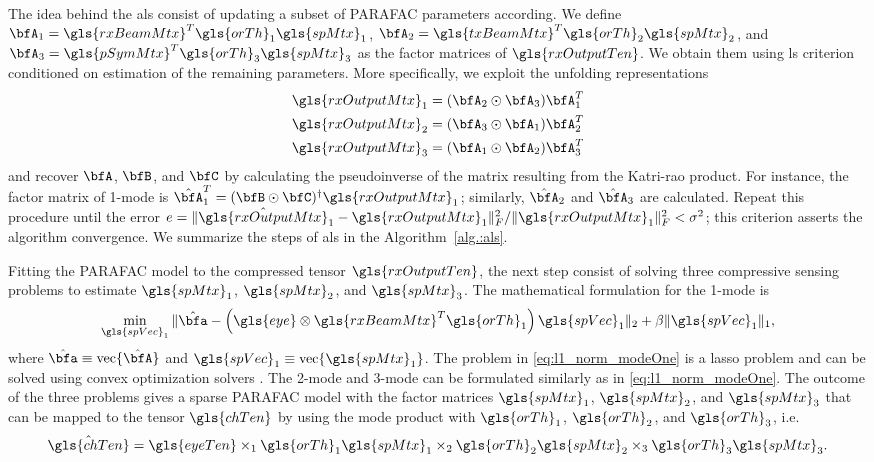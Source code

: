 \documentclass[conference]{IEEEtran}
\begin{document}
The idea behind the \gls{als} consist of updating a subset of \gls{PARAFAC} parameters
according. We define $\bfA _1 =
\gls{rxBeamMtx}^T\gls{orTh}_1\gls{spMtx}_1$, $\bfA_2 =
\gls{txBeamMtx}^T\gls{orTh}_2\gls{spMtx}_2$, and $\bfA_3 =
\gls{pSymMtx}^T\gls{orTh}_3\gls{spMtx}_3$   as the factor matrices of
$\gls{rxOutputTen}$. We obtain them using \gls{ls} criterion conditioned on estimation of the remaining
parameters. More specifically, we exploit the unfolding representations
\begin{align}
 \gls{rxOutputMtx}_1 = (\bfA_2 \odot \bfA_3)\bfA_1^T \\
 \gls{rxOutputMtx}_2 = (\bfA_3 \odot \bfA_1)\bfA_2^T \\
 \gls{rxOutputMtx}_3 = (\bfA_1 \odot \bfA_2)\bfA_3^T
\end{align}
and recover $\bfA$, $\bfB$, and $\bfC$ by calculating the pseudoinverse of the
matrix resulting from the Katri-rao product. For instance, the factor matrix of
1-mode is $\hat{\bfA}_1^T = (\bfB \odot \bfC)^{\dagger}\gls{rxOutputMtx}_1 $;
similarly, $\hat{\bfA}_2$ and $\hat{\bfA}_3$ are calculated. Repeat this procedure
until the error $e = \|\hat{\gls{rxOutputMtx}}_1 - \gls{rxOutputMtx}_1 \|^2_F/
\|\gls{rxOutputMtx}_1\|_F^2 < \sigma ^2$; this criterion asserts the algorithm convergence. We summarize the steps of \gls{als} in the Algorithm~\ref{alg.:als}. 

Fitting the \gls{PARAFAC} model to the compressed tensor $\gls{rxOutputTen}$,
the next step consist of solving three compressive sensing problems to estimate
$\gls{spMtx}_1$, $\gls{spMtx}_2$, and $\gls{spMtx}_3$. The mathematical
formulation for the 1-mode is
\begin{equation}
  \label{eq:l1_norm_modeOne}
  \min_{\gls{spVec}_1} \|\hat{\bfa} - \left( \gls{eye} \otimes \gls{rxBeamMtx}^T\gls{orTh}_1\right) \gls{spVec}_1\|_2 + \beta \|\gls{spVec}_1\|_1, 
\end{equation}
where $\hat{\bfa} \equiv \textrm{vec}\{\hat{\bfA}\}$ and  $\gls{spVec}_1 \equiv
\textrm{vec}\{\gls{spMtx}_1\}$. The problem in \eqref{eq:l1_norm_modeOne} is a
\gls{lasso} problem and can be solved using convex optimization solvers
\cite{Boyd:2004}. The 2-mode and 3-mode can be formulated similarly as in
\eqref{eq:l1_norm_modeOne}. The outcome of the three problems gives a sparse \gls{PARAFAC} model with
the factor matrices $\gls{spMtx}_1$, $\gls{spMtx}_2$, and $\gls{spMtx}_3$ that
can be mapped to the tensor $\gls{chTen}$ by using the mode product with
$\gls{orTh}_1$,  $\gls{orTh}_2$, and $\gls{orTh}_3$, i.e.
\begin{equation}
  \label{eq:sparse_mapping}
 \hat{\gls{chTen}}  =   \gls{eyeTen} \times_1  \gls{orTh}_1\gls{spMtx}_1 \times_2  \gls{orTh}_2\gls{spMtx}_2 \times_3 \gls{orTh}_3\gls{spMtx}_3.
\end{equation}
\end{document}
